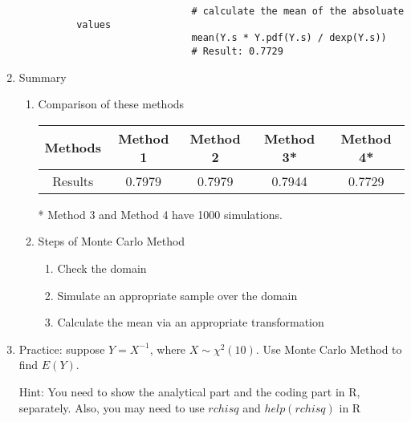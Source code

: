 \begin{enumerate}
\begin{enumerate}
\begin{enumerate}
\begin{itemize}
\begin{verbatim}
					# calculate the mean of the absoluate values
					mean(Y.s * Y.pdf(Y.s) / dexp(Y.s))
					# Result: 0.7729
					\end{verbatim}
				\end{itemize}
			\end{enumerate}
		\end{enumerate}
	\item Summary
		\begin{enumerate}
			\item Comparison of these methods
			\begin{center}
				\begin{tabular}{c | c | c | c | c}
					Methods & Method 1 & Method 2 & Method 3* & Method 4* \\
					\hline
					Results & 0.7979 & 0.7979 & 0.7944 & 0.7729
				\end{tabular}
			\end{center}
			* Method 3 and Method 4 have 1000 simulations.
			\item Steps of Monte Carlo Method
			\begin{enumerate}
				\item Check the domain
				\item Simulate an appropriate sample over the domain 
				\item Calculate the mean via an appropriate transformation
			\end{enumerate}
		\end{enumerate}
	\item Practice: suppose $Y = X^{-1}$, where $X \sim \chi^2(10)$. Use Monte Carlo Method to find $E(Y)$.
	\par Hint: You need to show the analytical part and the coding part in R, separately. Also, you may need to use $rchisq$ and $help(rchisq)$ in R
\end{enumerate}

\newpage
